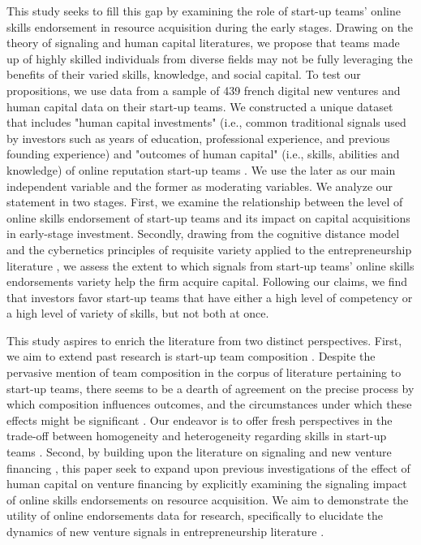 \documentclass[12pt]{article}
\begin{document}
This study seeks to fill this gap by examining the role of start-up teams' online skills endorsement in resource acquisition during the early stages. Drawing on the theory of signaling and human capital literatures, we propose that teams made up of highly skilled individuals from diverse fields may not be fully leveraging the benefits of their varied skills, knowledge, and social capital. To test our propositions, we use data from a sample of 439 french digital new ventures and human capital data on their start-up teams. We constructed a unique dataset that includes "human capital investments" (i.e., common traditional signals used by investors such as years of education, professional experience, and previous founding experience) and "outcomes of human capital" (i.e., skills, abilities and knowledge) of online reputation start-up teams \citep{marvel2016human}. We use the later as our main independent variable and the former as moderating variables. We analyze our statement in two stages. First, we examine the relationship between the level of online skills endorsement of start-up teams and its impact on capital acquisitions in early-stage investment. Secondly, drawing from the cognitive distance model \citep{nooteboom2007optimal} and the cybernetics principles of requisite variety applied to the entrepreneurship literature \citep{ashby1957introduction, harrison2007s, sundermeier2022entrepreneurial, villani2018entrepreneurial}, we assess the extent to which signals from start-up teams' online skills endorsements variety help the firm acquire capital. Following our claims, we find that investors favor start-up teams that have either a high level of competency or a high level of variety of skills, but not both at once.

This study aspires to enrich the literature from two distinct perspectives. First, we aim to extend past research is start-up team composition \citep{beckman2007early, jung2017entrepreneurial}. Despite the pervasive mention of team composition in the corpus of literature pertaining to start-up teams, there seems to be a dearth of agreement on the precise process by which composition influences outcomes, and the circumstances under which these effects might be significant \citep{klotz2014new, zhou2015entrepreneurial}. Our endeavor is to offer fresh perspectives in the trade-off between homogeneity and heterogeneity regarding skills in start-up teams \citep{sundermeier2022entrepreneurial, villani2018entrepreneurial}. Second, by building upon the literature on signaling and new venture financing \citep{colombo2021use, drover2017review, klein2020start}, this paper seek to expand upon previous investigations of the effect of human capital on venture financing \citep{banerji2019startup, marvel2016human, mollick2014dynamics, reese2020should} by explicitly examining the signaling impact of online skills endorsements on resource acquisition. We aim to demonstrate the utility of online endorsements data for research, specifically to elucidate the dynamics of new venture signals in entrepreneurship literature \citep{perez2016endorsement, gasiorowski2022pay}.
\end{document}
